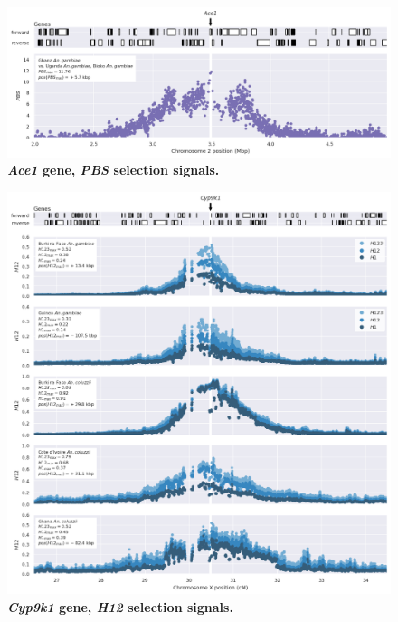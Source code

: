 \documentclass[a4paper,11pt,abstracton,hidelinks]{scrartcl}
\begin{document}
\clearpage


\begin{figure}[t!]
	\begin{center}
		\includegraphics*[width=1.1\linewidth,center]{artwork/locus_ace1_pbs.png}
	\end{center}
	\caption[\textit{Ace1} gene, \textit{PBS} selection signals]{
	\textbf{\textit{Ace1} gene, \textit{PBS} selection signals.}
	} 
	\label{fig:locus_ace1_pbs}
\end{figure}


\clearpage


\begin{figure}[t!]
	\begin{center}
		\includegraphics*[width=1.1\linewidth,center]{artwork/locus_cyp9k1_h12.png}
	\end{center}
	\caption[\textit{Cyp9k1} gene, \textit{H12} selection signals]{
	\textbf{\textit{Cyp9k1} gene, \textit{H12} selection signals.}
	} 
	\label{fig:locus_cyp9k1_h12}
\end{figure}
\end{document}
